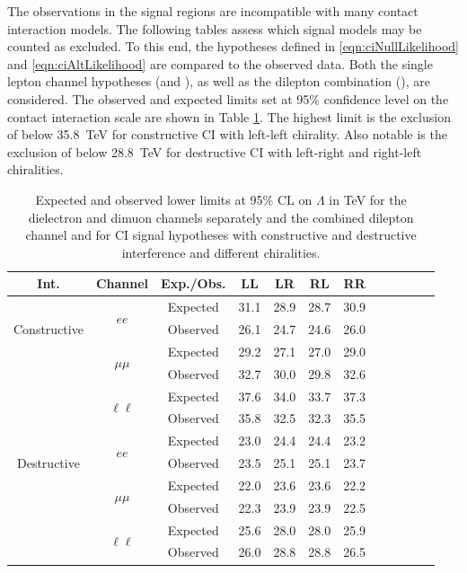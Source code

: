 The observations in the signal regions are incompatible with many contact interaction models.
The following tables assess which signal models may be counted as excluded.
To this end, the hypotheses defined in \ref{eqn:ciNullLikelihood} and \ref{eqn:ciAltLikelihood} are compared to the observed data.
Both the single lepton channel hypotheses (\ee and \mm), as well as the dilepton combination (\ll), are considered.
The observed and expected limits set at 95\% confidence level on the contact interaction scale \lam are shown in Table \ref{tab:lambdaLimits1}.
The highest limit is the exclusion of \lam below 35.8~TeV for \ll constructive CI with left-left chirality.
Also notable is the exclusion of \lam below 28.8~TeV for \ll destructive CI with left-right and right-left chiralities.

\begin{table}[h!]
\begin{center}
\caption{Expected and observed lower limits at 95$\%$ CL on $\Lambda$ in TeV for the dielectron and dimuon channels separately and the combined dilepton channel and for CI signal hypotheses with constructive and destructive interference and different chiralities.}
{\begin{tabular}{c c c c c c c c c c c c}\toprule
Int. & Channel & Exp./Obs. & LL & LR & RL & RR \\
\midrule
\multirow{3}{*}[-1.5em]{\begin{sideways}Constructive\end{sideways}} & \multirow{2}{*}{$ee$} & Expected & 31.1 & 28.9 & 28.7 & 30.9 \\
& & Observed & 26.1 & 24.7 & 24.6 & 26.0 \\
\cmidrule{2-7}
 & \multirow{2}{*}{$\mu\mu$} & Expected & 29.2 & 27.1 & 27.0 & 29.0 \\
& & Observed & 32.7 & 30.0 & 29.8 & 32.6 \\
\cmidrule{2-7}
 & \multirow{2}{*}{$\ell\ell$} & Expected & 37.6 & 34.0 & 33.7 & 37.3 \\
& & Observed & 35.8 & 32.5 & 32.3 & 35.5 \\
\midrule
\multirow{3}{*}[-1.5em]{\begin{sideways}Destructive\end{sideways}} & \multirow{2}{*}{$ee$} & Expected & 23.0 & 24.4 & 24.4 & 23.2 \\
& & Observed & 23.5 & 25.1 & 25.1 & 23.7 \\
\cmidrule{2-7}
 & \multirow{2}{*}{$\mu\mu$} & Expected & 22.0 & 23.6 & 23.6 & 22.2 \\
& & Observed & 22.3 & 23.9 & 23.9 & 22.5 \\
\cmidrule{2-7}
 & \multirow{2}{*}{$\ell\ell$} & Expected & 25.6 & 28.0 & 28.0 & 25.9 \\
& & Observed & 26.0 & 28.8 & 28.8 & 26.5 \\
\bottomrule\end{tabular}}
\label{tab:lambdaLimits1}
\end{center}
\end{table}

